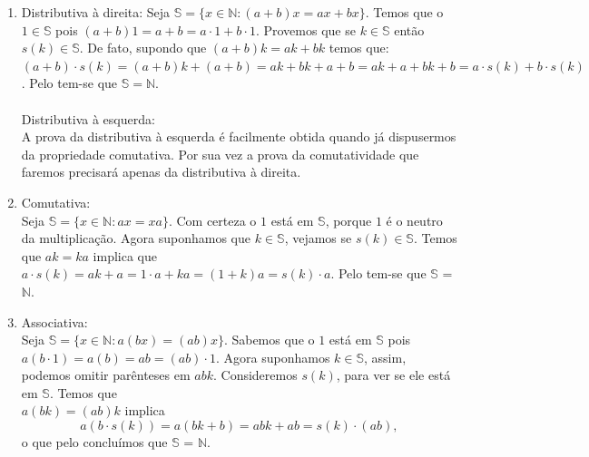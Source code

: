 \documentclass[../main.tex]{subfiles}
\begin{document}
\begin{dem}
\begin{enumerate}[label=(\roman*)]
        \item Distributiva à direita: 
            Seja $\mathbb{S} = \{ x \in \mathbb{N} : ( a + b ) x = ax + bx \}$. Temos que o $1 \in \mathbb{S}$ pois $( a + b ) 1 = a + b = a \cdot 1 + b \cdot 1$. Provemos que se $k \in \mathbb{S}$ então $s(k) \in \mathbb{S}$. De fato, supondo que $(a+b)k = ak+bk$ temos que: \\
            $( a + b ) \cdot s(k)= ( a + b ) k + ( a + b ) = ak + bk + a + b = ak + a + bk + b 
            = a \cdot s(k) + b \cdot s(k)$. Pelo  tem-se que $\mathbb{S} = \mathbb{N}$.
            \\ \\
            Distributiva à esquerda: \\
            A prova da distributiva à esquerda é facilmente obtida quando já dispusermos da propriedade comutativa. Por sua vez a prova da comutatividade que faremos precisará apenas da distributiva à direita.
        \item Comutativa: \\
            Seja $\mathbb{S} = \{ x \in \mathbb{N} : ax = xa \}$. Com certeza o $1$ está em $\mathbb{S}$, porque $1$ é o neutro da multiplicação. Agora suponhamos que $k \in \mathbb{S}$, vejamos se $s(k) \in \mathbb{S}$. Temos que $ak = ka$ implica que $a \cdot s(k) = ak + a = 1 \cdot a + ka = (1+k)a = s(k) \cdot a$. Pelo  tem-se que $\mathbb{S}$ = $\mathbb{N}$.

        \item Associativa:  \\
            Seja $\mathbb{S} = \{ x \in \mathbb{N} : a(bx) = (ab)x \}$. Sabemos que o $1$ está em $\mathbb{S}$ pois \\
            $a (b \cdot 1) = a(b) = ab = (ab)\cdot 1$.
            Agora suponhamos $k \in \mathbb{S}$, assim, podemos omitir parênteses em $abk$. Consideremos $s(k)$, para ver se ele está em $\mathbb{S}$. Temos que \\ $a(bk) = (ab)k$ implica 
            \[ a(b \cdot s(k)) = a(bk + b) = abk + ab = s(k) \cdot  (ab), \] 
            o que pelo  concluímos que $\mathbb{S}$ = $\mathbb{N}$. 
            

\end{enumerate}
\end{dem}
\end{document}
